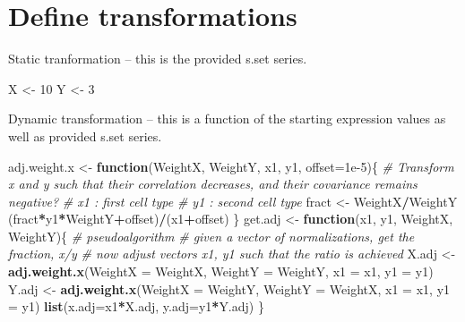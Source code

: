 \documentclass[
]{article}
\newenvironment{Shaded}{\begin{snugshade}}{\end{snugshade}}
\newcommand{\AttributeTok}[1]{\textcolor[rgb]{0.13,0.29,0.53}{#1}}
\newcommand{\CommentTok}[1]{\textcolor[rgb]{0.56,0.35,0.01}{\textit{#1}}}
\newcommand{\ControlFlowTok}[1]{\textcolor[rgb]{0.13,0.29,0.53}{\textbf{#1}}}
\newcommand{\DecValTok}[1]{\textcolor[rgb]{0.00,0.00,0.81}{#1}}
\newcommand{\FloatTok}[1]{\textcolor[rgb]{0.00,0.00,0.81}{#1}}
\newcommand{\FunctionTok}[1]{\textcolor[rgb]{0.13,0.29,0.53}{\textbf{#1}}}
\newcommand{\NormalTok}[1]{#1}
\newcommand{\OtherTok}[1]{\textcolor[rgb]{0.56,0.35,0.01}{#1}}
\newcommand{\SpecialCharTok}[1]{\textcolor[rgb]{0.81,0.36,0.00}{\textbf{#1}}}
\begin{document}
\hypertarget{define-transformations}{%
\section{Define transformations}\label{define-transformations}}

Static tranformation -- this is the provided s.set series.

\begin{Shaded}
\begin{Highlighting}[]
\NormalTok{X }\OtherTok{\textless{}{-}} \DecValTok{10}
\NormalTok{Y }\OtherTok{\textless{}{-}} \DecValTok{3}
\end{Highlighting}
\end{Shaded}

Dynamic transformation -- this is a function of the starting expression
values as well as provided s.set series.

\begin{Shaded}
\begin{Highlighting}[]
\NormalTok{adj.weight.x }\OtherTok{\textless{}{-}} \ControlFlowTok{function}\NormalTok{(WeightX, WeightY, x1, y1, }\AttributeTok{offset=}\FloatTok{1e{-}5}\NormalTok{)\{}
  \CommentTok{\# Transform x and y such that their correlation decreases, and their covariance remains negative?}
  \CommentTok{\# x1 : first cell type}
  \CommentTok{\# y1 : second cell type}
\NormalTok{  fract }\OtherTok{\textless{}{-}}\NormalTok{ WeightX}\SpecialCharTok{/}\NormalTok{WeightY}
\NormalTok{  (fract}\SpecialCharTok{*}\NormalTok{y1}\SpecialCharTok{*}\NormalTok{WeightY}\SpecialCharTok{+}\NormalTok{offset)}\SpecialCharTok{/}\NormalTok{(x1}\SpecialCharTok{+}\NormalTok{offset)}
\NormalTok{\}}
\NormalTok{get.adj }\OtherTok{\textless{}{-}} \ControlFlowTok{function}\NormalTok{(x1, y1, WeightX, WeightY)\{}
  \CommentTok{\# pseudoalgorithm}
  \CommentTok{\# given a vector of normalizations, get the fraction, x/y}
  \CommentTok{\# now adjust vectors x1, y1 such that the ratio is achieved}
\NormalTok{  X.adj }\OtherTok{\textless{}{-}} \FunctionTok{adj.weight.x}\NormalTok{(}\AttributeTok{WeightX =}\NormalTok{ WeightX, }\AttributeTok{WeightY =}\NormalTok{ WeightY, }\AttributeTok{x1 =}\NormalTok{ x1, }\AttributeTok{y1 =}\NormalTok{ y1)}
\NormalTok{  Y.adj }\OtherTok{\textless{}{-}} \FunctionTok{adj.weight.x}\NormalTok{(}\AttributeTok{WeightX =}\NormalTok{ WeightY, }\AttributeTok{WeightY =}\NormalTok{ WeightX, }\AttributeTok{x1 =}\NormalTok{ x1, }\AttributeTok{y1 =}\NormalTok{ y1)}
  \FunctionTok{list}\NormalTok{(}\AttributeTok{x.adj=}\NormalTok{x1}\SpecialCharTok{*}\NormalTok{X.adj, }\AttributeTok{y.adj=}\NormalTok{y1}\SpecialCharTok{*}\NormalTok{Y.adj)}
\NormalTok{\}}
\end{Highlighting}
\end{Shaded}
\end{document}
